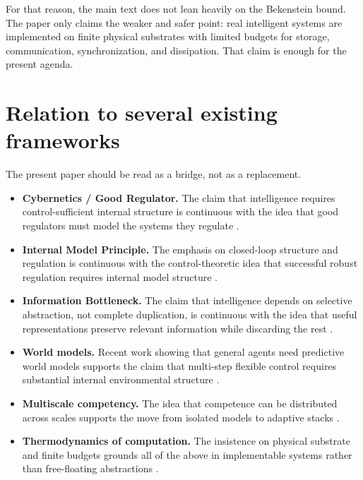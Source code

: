 \documentclass[11pt]{article}
\begin{document}
For that reason, the main text does not lean heavily on the Bekenstein bound. The paper only claims the weaker and safer point: real intelligent systems are implemented on finite physical substrates with limited budgets for storage, communication, synchronization, and dissipation. That claim is enough for the present agenda.

\section{Relation to several existing frameworks}


The present paper should be read as a bridge, not as a replacement.

\begin{itemize}
\item \textbf{Cybernetics / Good Regulator.}
The claim that intelligence requires control-sufficient internal structure is continuous with the idea that good regulators must model the systems they regulate \citep{conant1970}.

\item \textbf{Internal Model Principle.}
The emphasis on closed-loop structure and regulation is continuous with the control-theoretic idea that successful robust regulation requires internal model structure \citep{francis1976}.

\item \textbf{Information Bottleneck.}
The claim that intelligence depends on selective abstraction, not complete duplication, is continuous with the idea that useful representations preserve relevant information while discarding the rest \citep{tishby2000}.

\item \textbf{World models.}
Recent work showing that general agents need predictive world models supports the claim that multi-step flexible control requires substantial internal environmental structure \citep{richens2025}.

\item \textbf{Multiscale competency.}
The idea that competence can be distributed across scales supports the move from isolated models to adaptive stacks \citep{levin2023,mcmillen2024}.

\item \textbf{Thermodynamics of computation.}
The insistence on physical substrate and finite budgets grounds all of the above in implementable systems rather than free-floating abstractions \citep{landauer1961}.

\end{itemize}

\nocite{zhang2024}


\end{document}
